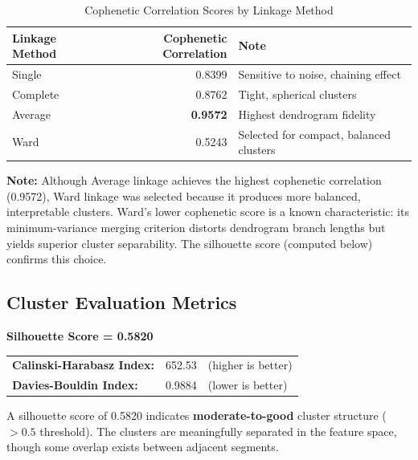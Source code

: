 \documentclass[12pt,a4paper]{article}
\begin{document}
\begin{table}[H]
\centering
\caption{Cophenetic Correlation Scores by Linkage Method}
\label{tab:cophenetic}
\begin{tabular}{l r l}
\toprule
\textbf{Linkage Method} & \textbf{Cophenetic Correlation} & \textbf{Note} \\
\midrule
Single   & 0.8399 & Sensitive to noise, chaining effect \\
Complete & 0.8762 & Tight, spherical clusters \\
\rowcolor{yellow!15}
Average  & \textbf{0.9572} & Highest dendrogram fidelity \\
Ward     & 0.5243 & Selected for compact, balanced clusters \\
\bottomrule
\end{tabular}
\end{table}

\textbf{Note:} Although Average linkage achieves the highest cophenetic correlation (0.9572), Ward linkage was selected because it produces more balanced, interpretable clusters. Ward's lower cophenetic score is a known characteristic: its minimum-variance merging criterion distorts dendrogram branch lengths but yields superior cluster separability. The silhouette score (computed below) confirms this choice.

\subsection{Cluster Evaluation Metrics}

\begin{bestbox}
\begin{center}
{\Large\textbf{Silhouette Score = 0.5820}}
\end{center}
\vspace{4pt}
\begin{tabular}{l r l}
\textbf{Calinski-Harabasz Index:} & 652.53 & (higher is better) \\
\textbf{Davies-Bouldin Index:} & 0.9884 & (lower is better) \\
\end{tabular}
\vspace{6pt}

A silhouette score of 0.5820 indicates \textbf{moderate-to-good} cluster structure ($> 0.5$ threshold). The clusters are meaningfully separated in the feature space, though some overlap exists between adjacent segments.
\end{bestbox}
\end{document}
